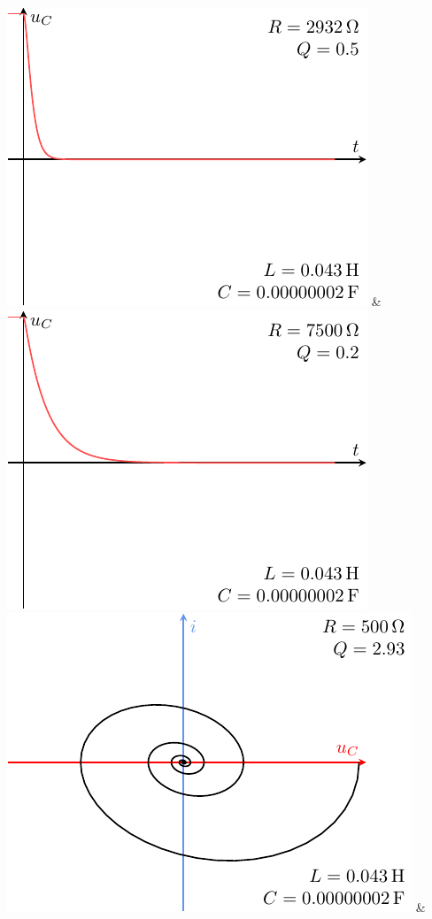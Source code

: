 \documentclass[../../main/main.tex]{subfiles}
\begin{document}
\begin{tcb}[label=ror:resumeamorti, tabularx={Y|Y|Y}]
	\includegraphics[width=\linewidth]{carac-rlc-05} &
	\includegraphics[width=\linewidth]{carac-rlc-02}
	\\\hline
	\includegraphics[width=\linewidth]{carac-rlc_xy-3} &

\end{tcb}
\end{document}
